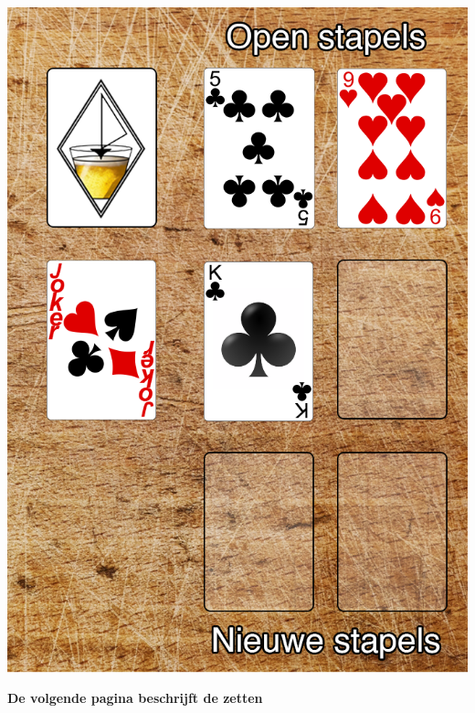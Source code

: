 \begin{minipage}[t]{.48\textwidth}
\includegraphics[width=.96\textwidth]{img/Frits_plank_v4_2.png}
\end{minipage}

\vspace{+0.5cm}

\centerline{\Large{\textbf{De volgende pagina beschrijft de zetten}}}